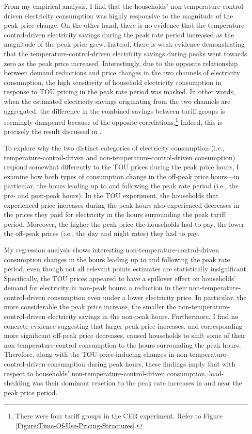 From my empirical analysis, I find that the households' non-temperature-control-driven electricity consumption was highly responsive to the magnitude of the peak price change. On the other hand, there is no evidence that the temperature-control-driven electricity savings during the peak rate period increased as the magnitude of the peak price grew. Instead, there is weak evidence demonstrating that the temperature-control-driven electricity savings during peaks went towards zero as the peak price increased. Interestingly, due to the opposite relationship between demand reductions and price changes in the two channels of electricity consumption, the high sensitivity of household electricity consumption in response to TOU pricing in the peak rate period was masked. In other words, when the estimated electricity savings originating from the two channels are aggregated, the difference in the combined savings between tariff groups is seemingly dampened because of the opposite correlations.\footnote{There were four tariff groups in the CER experiment. Refer to Figure \ref{Figure:Time-Of-Use-Pricing-Structures}.} Indeed, this is precisely the result discussed in \cite{Peaking-Interest:How-Awareness-Drives-the-Effectiveness-of-Time-of-Use-Electricity-Pricing_Prest_2020}. 

To explore why the two distinct categories of electricity consumption (i.e., temperature-control-driven and non-temperature-control-driven consumption) respond somewhat differently to the TOU prices during the peak price hours, I examine how both types of consumption change in the off-peak price hours---in particular, the hours leading up to and following the peak rate period (i.e., the pre- and post-peak hours). In the TOU experiment, the households that experienced price increases during the peak hours also experienced decreases in the prices they paid for electricity in the hours surrounding the peak tariff period. Moreover, the higher the peak price the households had to pay, the lower the off-peak prices (i.e., the day and night rates) they had to pay. 

My regression analysis shows interesting non-temperature-control-driven consumption changes in the hours leading up to and following the peak rate period, even though not all relevant points estimates are statistically insignificant. Specifically, the TOU prices appeared to have a spillover effect on households' demand for electricity in non-peak hours: a reduction in their non-temperature-control-driven consumption even under a lower electricity price. In particular, the more considerable the peak price increase, the smaller the non-temperature-control-driven electricity savings in the non-peak hours. Furthermore, I find no concrete evidence suggesting that larger peak price increases, and corresponding more significant off-peak price decreases, caused households to shift some of their non-temperature-control consumption to the hours surrounding the peak hours. Therefore, along with the TOU-price-inducing changes in non-temperature-control-driven consumption during peak hours, these findings imply that with respect to households' non-temperature-control-driven consumption, load-shedding was their dominant reaction to the peak rate increases in and near the peak price period.

